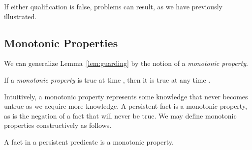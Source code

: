 If either qualification is false, problems can result, as we have previously illustrated.


\subsection{Monotonic Properties}


We can generalize Lemma~\ref{lem:guarding} by the notion of a {\em monotonic property}.

\begin{definition}
If a {\em monotonic property} is true at time , then it is true at any time .
\end{definition}

Intuitively, a monotonic property represents some knowledge that never becomes untrue as we acquire  more knowledge.  A persistent fact is a monotonic property, as is the negation of a
fact that will never be true.  We may define monotonic properties constructively as follows.



\begin{definition}
A fact in a persistent predicate is a monotonic property. 
\end{definition}


